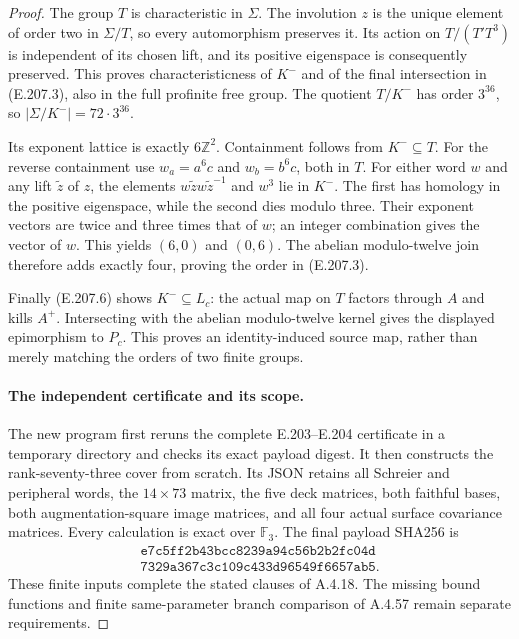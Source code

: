 \begin{proof}
The group $T$ is characteristic in $\Sigma$.  The involution
$z$ is the unique element of order two in $\Sigma/T$, so
every automorphism preserves it.  Its action on
$T/(T'T^3)$ is independent of its chosen lift, and its
positive eigenspace is consequently preserved.  This
proves characteristicness of $K^-$ and of the final
intersection in (E.207.3), also in the full profinite
free group.  The quotient $T/K^-$ has order $3^{36}$,
so $|\Sigma/K^-|=72\cdot3^{36}$.

Its exponent lattice is exactly $6\mathbb Z^2$.
Containment follows from $K^-\subseteq T$.  For the
reverse containment use
$w_a=a^6c$ and $w_b=b^6c$, both in $T$.
For either word $w$ and any lift $\widetilde z$ of $z$,
the elements $w\widetilde z w\widetilde z^{-1}$ and
$w^3$ lie in $K^-$.  The first has homology in the
positive eigenspace, while the second dies modulo three.
Their exponent vectors are twice and three times that
of $w$; an integer combination gives the vector of $w$.
This yields $(6,0)$ and $(0,6)$.  The abelian modulo-twelve
join therefore adds exactly four, proving the order in
(E.207.3).

Finally (E.207.6) shows $K^-\subseteq L_c$: the actual
map on $T$ factors through $A$ and kills $A^+$.
Intersecting with the abelian modulo-twelve kernel gives
the displayed epimorphism to $P_c$.  This proves an
identity-induced source map, rather than merely matching
the orders of two finite groups.

\paragraph{The independent certificate and its scope.}
The new program first reruns the complete E.203--E.204
certificate in a temporary directory and checks its
exact payload digest.  It then constructs the rank-seventy-three
cover from scratch.  Its JSON retains all Schreier and
peripheral words, the $14\times73$ matrix, the five deck
matrices, both faithful bases, both augmentation-square
image matrices, and all four actual surface covariance
matrices.  Every calculation is exact over $\mathbb F_3$.
The final payload SHA256 is
\[
 \begin{gathered}
 \texttt{e7c5ff2b43bcc8239a94c56b2b2fc04d}\\[-2pt]
 \texttt{7329a367c3c109c433d96549f6657ab5}.
 \end{gathered}                                                   \tag{E.207.9}
\]
These finite inputs complete the stated clauses of A.4.18.
The missing bound functions and finite same-parameter
branch comparison of A.4.57 remain separate requirements.
\end{proof}
